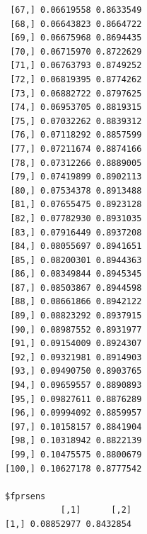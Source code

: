 \documentclass[
  letterpaper,
  DIV=11,
  numbers=noendperiod]{scrartcl}
\begin{document}
\begin{verbatim}
 [67,] 0.06619558 0.8633549
 [68,] 0.06643823 0.8664722
 [69,] 0.06675968 0.8694435
 [70,] 0.06715970 0.8722629
 [71,] 0.06763793 0.8749252
 [72,] 0.06819395 0.8774262
 [73,] 0.06882722 0.8797625
 [74,] 0.06953705 0.8819315
 [75,] 0.07032262 0.8839312
 [76,] 0.07118292 0.8857599
 [77,] 0.07211674 0.8874166
 [78,] 0.07312266 0.8889005
 [79,] 0.07419899 0.8902113
 [80,] 0.07534378 0.8913488
 [81,] 0.07655475 0.8923128
 [82,] 0.07782930 0.8931035
 [83,] 0.07916449 0.8937208
 [84,] 0.08055697 0.8941651
 [85,] 0.08200301 0.8944363
 [86,] 0.08349844 0.8945345
 [87,] 0.08503867 0.8944598
 [88,] 0.08661866 0.8942122
 [89,] 0.08823292 0.8937915
 [90,] 0.08987552 0.8931977
 [91,] 0.09154009 0.8924307
 [92,] 0.09321981 0.8914903
 [93,] 0.09490750 0.8903765
 [94,] 0.09659557 0.8890893
 [95,] 0.09827611 0.8876289
 [96,] 0.09994092 0.8859957
 [97,] 0.10158157 0.8841904
 [98,] 0.10318942 0.8822139
 [99,] 0.10475575 0.8800679
[100,] 0.10627178 0.8777542

$fprsens
           [,1]      [,2]
[1,] 0.08852977 0.8432854
\end{verbatim}
\end{document}
